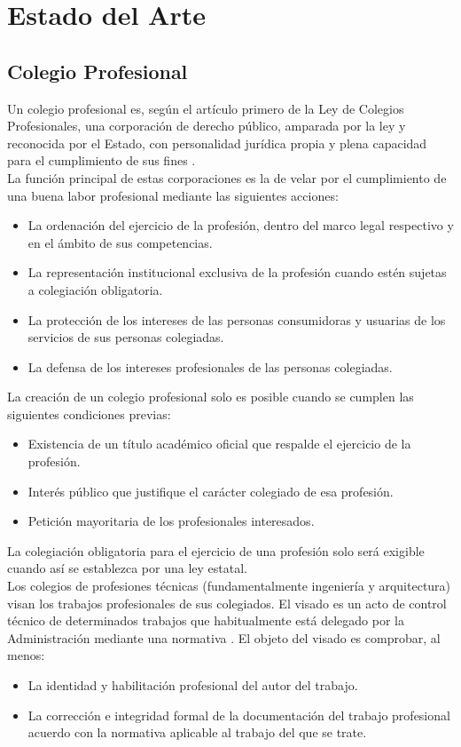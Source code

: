 \chapter{Estado del Arte}

\section{Colegio Profesional}
Un colegio profesional es, según el artículo primero de la Ley de Colegios Profesionales, una corporación de derecho público, amparada por la ley y reconocida por el Estado, con personalidad jurídica propia y plena capacidad para el cumplimiento de sus fines \cite{colegiosjunta}. \\

La función principal de estas corporaciones es la de velar por el cumplimiento de una buena labor profesional mediante las siguientes acciones:
\begin{itemize}
\item La ordenación del ejercicio de la profesión, dentro del marco legal respectivo y en el ámbito de sus competencias.
\item La representación institucional exclusiva de la profesión cuando estén sujetas a colegiación obligatoria.
\item La protección de los intereses de las personas consumidoras y usuarias de los servicios de sus personas colegiadas.
\item La defensa de los intereses profesionales de las personas colegiadas. \\
\end{itemize}

La creación de un colegio profesional solo es posible cuando se cumplen las siguientes condiciones previas:
\begin{itemize}
\item Existencia de un título académico oficial que respalde el ejercicio de la profesión.
\item Interés público que justifique el carácter colegiado de esa profesión.
\item Petición mayoritaria de los profesionales interesados.  \\
\end{itemize}

La colegiación obligatoria para el ejercicio de una profesión solo será exigible cuando así se establezca por una ley estatal. \\

Los colegios de profesiones técnicas (fundamentalmente ingeniería y arquitectura) visan los trabajos profesionales de sus colegiados. El visado es un acto de control técnico de determinados trabajos que habitualmente está delegado por la Administración mediante una normativa \cite{colegioswikipedia}. El objeto del visado es comprobar, al menos:
\begin{itemize}
\item La identidad y habilitación profesional del autor del trabajo.
\item La corrección e integridad formal de la documentación del trabajo profesional acuerdo con la normativa aplicable al trabajo del que se trate.
\end{itemize}


